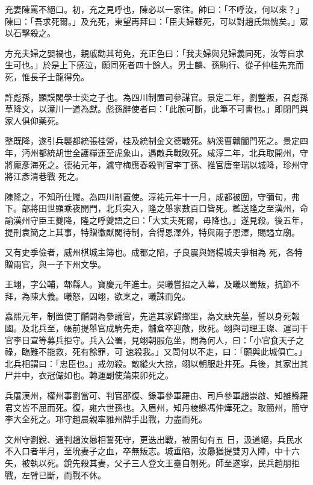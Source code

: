 \begin{pinyinscope}
 充妻陳罵不絕口。初，充之見呼也，陳必以一家往。帥曰：「不呼汝，何以來？」陳曰：「吾求死爾。」及充死，東望再拜曰：「臣夫婦雖死，可以對趙氏無愧矣。」眾以石擊殺之。



 方充夫婦之嬰禍也，親戚勸其茍免，充正色曰：「我夫婦與兒婦義同死，汝等自求生可也。」於是上下感泣，願同死者四十餘人。男士麟、孫駒行、從子仲桂先充而死，惟長子士龍得免。



 許彪孫，顯謨閣學士奕之子也。為四川制置司參謀官。景定二年，劉整叛，召彪孫草降文，以潼川一道為獻。彪孫辭使者曰：「此腕可斷，此筆不可書也。」即閉門與家人俱仰藥死。



 整既降，遂引兵襲都統張桂營，桂及統制金文德戰死。納溪曹贛闔門死之。景定四年，沔州都統胡世全護糧運至虎象山，遇敵兵戰敗死。咸淳二年，北兵取開州，守將龐彥海死之。德祐元年，瀘守梅應春殺判官李丁孫、推官唐奎瑞以城降，珍州守將江彥清巷戰
 死之。



 陳隆之，不知所仕履。為四川制置使。淳祐元年十一月，成都被圍，守彌旬，弗下。部將田世顯乘夜開門，北兵突入，隆之舉家數百口皆死。檻送隆之至漢州，命諭漢州守臣王夔降，隆之呼夔語之曰：「大丈夫死爾，毋降也。」遂見殺。後五年，提刑袁簡之上其事，特贈徽猷閣待制，合得恩澤外，特與兩子恩澤，賜謚立廟。



 又有史季儉者，威州棋城主簿也。成都之陷，子良震與婿楊城夫爭相為
 死，各特贈兩官，與一子下州文學。



 王翊，字公輔，郫縣人。寶慶元年進士。吳曦嘗招之入幕，及曦以蜀叛，抗節不拜，為陳大義。曦怒，囚翊，欲烹之，曦誅而免。



 嘉熙元年，制置使丁黼闢為參議官，先遣其家歸鄉里，為文訣先墓，誓以身死報國。及北兵至，帳前提舉官成駒先走，黼倉卒迎敵，敗死。翊與司理王璨、運司干官李日宣等募兵拒守。兵入公署，見翊朝服危坐，問為何人，曰：「小官食天子之祿，臨難不能救，死有餘罪，可
 速殺我。」又問何以不走，曰：「願與此城俱亡。」北兵相謂曰：「忠臣也。」戒勿殺。敵縱火大掠，翊以朝服赴井死。兵後，其家出其尸井中，衣冠儼如也。轉運副使蒲東卯死之。



 兵屠漢州，權州事劉當可、判官邵復、錄事參軍羅由、司戶參軍趙崇啟、知雒縣羅君文皆不屈而死。復，雍六世孫也。入眉州，知丹棱縣馮仲燁死之。取簡州，簡守李大全死之。邛守趙晨親率雅州牌手出戰，力盡而死。



 文州守劉銳、通判趙汝曏相誓死守，更迭出戰，被圍旬有五
 日，汲道絕，兵民水不入口者半月，至吮妻子之血，卒無叛志。城垂陷，汝曏猶提雙刃入陣，中十六矢，被執以死。銳先殺其妻，父子三人登文王臺自刎死。師至遂寧，民兵趙朋拒戰，左臂已斷，而戰不休。




\end{pinyinscope}
